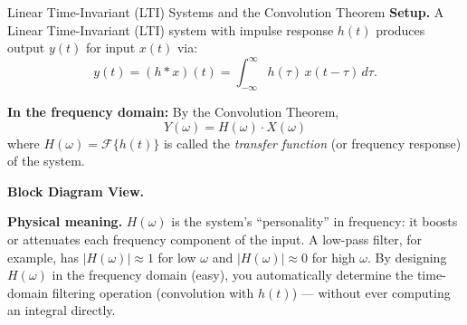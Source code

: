 \documentclass[12pt,a4paper]{article}
\begin{document}
\begin{infobox}{Linear Time-Invariant (LTI) Systems and the Convolution Theorem}
\textbf{Setup.} A Linear Time-Invariant (LTI) system with impulse response $h(t)$
produces output $y(t)$ for input $x(t)$ via:
\[
  y(t) = (h * x)(t) = \int_{-\infty}^{\infty} h(\tau)\,x(t-\tau)\,d\tau.
\]

\textbf{In the frequency domain:} By the Convolution Theorem,
\[
  \boxed{Y(\omega) = H(\omega)\cdot X(\omega)}
\]
where $H(\omega) = \mathcal{F}\{h(t)\}$ is called the \emph{transfer function}
(or frequency response) of the system.

\medskip
\textbf{Block Diagram View.}

\begin{center}
\end{center}

\medskip
\textbf{Physical meaning.} $H(\omega)$ is the system's ``personality'' in
frequency: it boosts or attenuates each frequency component of the input.
A low-pass filter, for example, has $|H(\omega)| \approx 1$ for low $\omega$
and $|H(\omega)| \approx 0$ for high $\omega$. By designing $H(\omega)$ in the
frequency domain (easy), you automatically determine the time-domain
filtering operation (convolution with $h(t)$) --- without ever computing an
integral directly.
\end{infobox}
\end{document}
